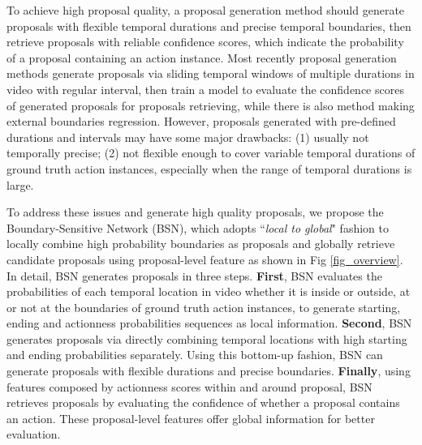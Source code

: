 \documentclass[runningheads]{llncs}
\begin{document}
To achieve high proposal quality, a proposal generation method should generate proposals with flexible temporal durations and precise temporal boundaries, then retrieve  proposals with reliable confidence scores, which indicate the probability of  a proposal containing an action instance.
Most recently proposal generation methods \cite{sst_buch_cvpr17,fast_temporal_activity_cvpr16,escorcia2016daps,shou2016action} generate proposals via sliding temporal windows of multiple durations in video with regular interval, then train a model to evaluate the confidence scores of generated proposals for proposals retrieving, while there is also method \cite{gao2017turn} making external boundaries regression.
However, proposals generated with pre-defined durations and intervals may have some major drawbacks: (1) usually not temporally precise; (2) not flexible enough to cover variable temporal durations of ground truth action instances, especially when the range of temporal durations is large.



To address these issues and generate high quality proposals, we propose the  Boundary-Sensitive Network (BSN), which adopts ``\emph{local to global}" fashion to locally combine high probability boundaries as proposals and globally retrieve candidate proposals using proposal-level feature as shown in Fig \ref{fig_overview}.
%
In detail, BSN generates proposals in three steps.
{\bf First}, BSN evaluates the probabilities of each temporal location in video whether it is inside or outside, at or not at the boundaries of ground truth action instances, to generate starting, ending and actionness probabilities sequences as local information.
{\bf Second}, BSN generates proposals via directly  combining temporal locations with high starting and ending probabilities separately. Using this bottom-up fashion, BSN can generate proposals with flexible durations and precise boundaries.
{\bf Finally}, using features composed by actionness scores within and around proposal, BSN retrieves proposals by evaluating the confidence of whether a proposal contains an action.  These proposal-level features offer global information for better evaluation.
\end{document}
